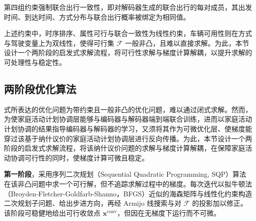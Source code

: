 第四组约束强制联合出行一致性，即对解码器生成的联合出行的每对成员，其出发时间、到达时间、方式分布与联合出行概率被绑定为相同值。

上述约束中，时序排序、属性可行与联合一致性为线性约束，车辆可用性则在方式与驾驶变量上为双线性，使得可行集 $\mathcal{F}$ 一般非凸，且难以直接求解。为此，本节设计一个两阶段的启发式求解流程，将可行性求解与梯度计算解耦，以提升求解的可处理性与稳定性。

\subsection{两阶段优化算法}\label{subsec.cohact.nash.twophase}

式所表达的优化问题为带约束且一般非凸的优化问题，难以通过闭式求解。然而，为使家庭活动计划协调层能够与编码器与解码器端到端联合训练，进而以家庭活动计划协调的结果指导编码器与解码器的学习，又须将其作为可微优化层、使梯度能穿过该基于纳什议价的家庭活动计划协调层进行反向传播。为此，本节设计一个两阶段的启发式求解流程，将该纳什议价问题的求解与梯度计算解耦，在保障家庭活动协调可行性的同时，使梯度计算可微且稳定。

\textbf{第一阶段}，采用序列二次规划（Sequential Quadratic Programming, SQP）\citep{bSimplicialAlgorithmConcave1963}算法在该非凸问题中求一个可行解，但不追踪求解过程中的梯度。每次迭代以拟牛顿法（Broyden-Fletcher-Goldfarb-Shanno，BFGS）近似的海森矩阵与线性化约束构造二次规划子问题、给出步进方向，再经 Armijo 线搜索与对 $\mathcal{F}$ 的投影加以修正。该阶段可稳健地给出可行收敛点 $\mathbf{x}^{\mathrm{conv}}$，但因在无梯度下运行而不可微。

